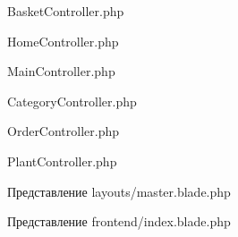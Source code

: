 
BasketController.php


HomeController.php


MainController.php


CategoryController.php


OrderController.php


PlantController.php


Представление layouts/master.blade.php


Представление frontend/index.blade.php


\fi
